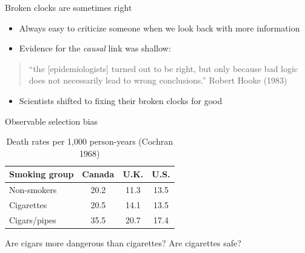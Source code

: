 \documentclass{beamer}
\begin{document}
\begin{frame}{Broken clocks are sometimes right}
	
  \begin{itemize}
		\item Always easy to criticize someone when we look back with more information 
		\item Evidence for the \emph{causal} link was shallow: 
  \end{itemize}

  \begin{quote}  
    ``the [epidemiologists] turned out to be right, but only because bad logic does not necessarily lead to wrong conclusions.'' Robert Hooke (1983)
  \end{quote}
	
  \begin{itemize}
    \item Scientists shifted to fixing their broken clocks for good
  \end{itemize}

\end{frame}


\begin{frame}{Observable selection bias}
	
	\begin{table}\centering
		\caption{Death rates per 1,000 person-years (Cochran 1968)}
		\begin{center}
		\begin{tabular}{lccc}
		\hline \hline
		\multicolumn{1}{l}{Smoking group}&
		\multicolumn{1}{c}{Canada}&
		\multicolumn{1}{c}{U.K.}&
		\multicolumn{1}{c}{U.S.}\\
		\hline
		Non-smokers & 20.2 & 11.3 & 13.5\\
		Cigarettes & 20.5 & 14.1 & 13.5 \\
		Cigars/pipes & 35.5 & 20.7 & 17.4\\
		\hline
		\end{tabular}
		\end{center}
	\end{table}
	
Are cigars more dangerous than cigarettes?  Are cigarettes safe?
	
\end{frame}
\end{document}

